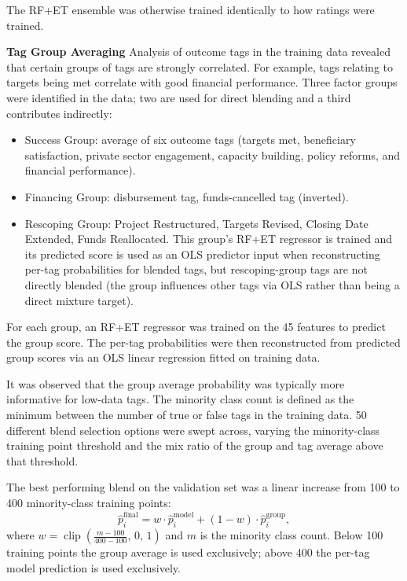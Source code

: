 \documentclass[12pt,a4paper]{article}
\begin{document}
The RF+ET ensemble was otherwise trained identically to how ratings were trained. 



\textbf{Tag Group Averaging}
Analysis of outcome tags in the training data revealed that certain groups of tags are strongly correlated. For example, tags relating to targets being met correlate with good financial performance. Three factor groups were identified in the data; two are used for direct blending and a third contributes indirectly:

\begin{itemize}
    \item Success Group: average of six outcome tags (targets met,  beneficiary satisfaction, private sector engagement, capacity building, policy reforms,  and financial performance).
    \item Financing Group: disbursement tag, funds-cancelled tag (inverted).
    \item Rescoping Group: Project Restructured, Targets Revised, Closing Date Extended, Funds Reallocated. This group's RF+ET regressor is trained and its predicted score is used as an OLS predictor input when reconstructing per-tag probabilities for blended tags, but rescoping-group tags are not directly blended (the group influences other tags via OLS rather than being a direct mixture target).
\end{itemize}

For each group, an RF+ET regressor was trained on the 45 features to predict the group score. The per-tag probabilities were then reconstructed from predicted group scores via an OLS linear regression fitted on training data.

It was observed that the group average probability was typically more informative for low-data tags. The minority class count is defined as the minimum between the number of true or false tags in the training data. 50 different blend selection options were swept across, varying the minority-class training point threshold and the mix ratio of the group and tag average above that threshold.

The best performing blend on the validation set was a linear increase from 100 to 400 minority-class training points:
\[
\hat{p}^{\text{final}}_i = w \cdot \hat{p}^{\text{model}}_i + (1 - w) \cdot \hat{p}^{\text{group}}_i ,
\]
where $w = \operatorname{clip}\!\left(\tfrac{m - 100}{400 - 100},\, 0,\, 1\right)$ and $m$ is the minority class count. Below 100 training points the group average is used exclusively; above 400 the per-tag model prediction is used exclusively.
\end{document}
